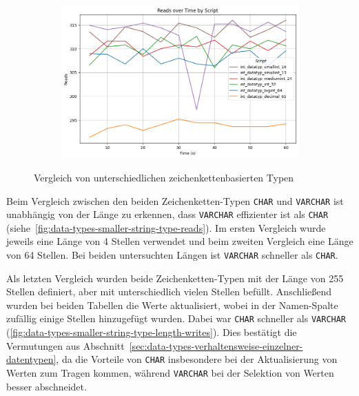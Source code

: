 \vspace{-12pt}
\begin{figure}[H]
    \centering
    \begin{subfigure}[t]{0.48\textwidth}
        \centering
        \includegraphics[width=\textwidth]{PNGs/Script/Data_Types/Smaller/number-type/Reads}
    \end{subfigure}
    \vspace{-10pt}
    \caption[Datentypen: Numerische Datentypen]{Vergleich von unterschiedlichen zeichenkettenbasierten Typen}
    \label{data-types-smaller-number-type-reads}
\end{figure}
\vspace{-20pt}

Beim Vergleich zwischen den beiden Zeichenketten-Typen \texttt{CHAR} und \texttt{VARCHAR} ist unabhängig von der Länge zu erkennen, dass \texttt{VARCHAR} effizienter ist als \texttt{CHAR} (siehe~\ref{fig:data-types-smaller-string-type-reads}).
Im ersten Vergleich wurde jeweils eine Länge von 4 Stellen verwendet und beim zweiten Vergleich eine Länge von 64 Stellen.
Bei beiden untersuchten Längen ist \texttt{VARCHAR} schneller als \texttt{CHAR}.

Als letzten Vergleich wurden beide Zeichenketten-Typen mit der Länge von 255 Stellen definiert, aber mit unterschiedlich vielen Stellen befüllt.
Anschließend wurden bei beiden Tabellen die Werte aktualisiert, wobei in der Namen-Spalte zufällig einige Stellen hinzugefügt wurden.
Dabei war \texttt{CHAR} schneller als \texttt{VARCHAR} (\ref{fig:data-types-smaller-string-type-length-writes}).
Dies bestätigt die Vermutungen aus Abschnitt~\ref{sec:data-types-verhaltensweise-einzelner-datentypen}, da die Vorteile von \texttt{CHAR} insbesondere bei der Aktualisierung von Werten zum Tragen kommen, während \texttt{VARCHAR} bei der Selektion von Werten besser abschneidet.

